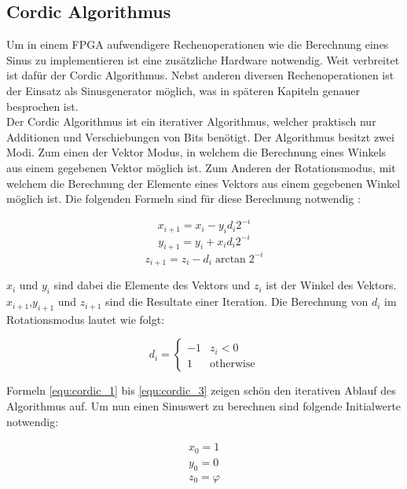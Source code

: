 \subsection{Cordic Algorithmus}\label{subsec:Cordic}

Um in einem FPGA aufwendigere Rechenoperationen wie die Berechnung eines Sinus zu implementieren ist eine zusätzliche Hardware notwendig. Weit verbreitet ist dafür der Cordic Algorithmus. Nebst anderen diversen Rechenoperationen ist der Einsatz als Sinusgenerator möglich, was in späteren Kapiteln genauer besprochen ist. \\
Der Cordic Algorithmus ist ein iterativer Algorithmus, welcher praktisch nur Additionen und Verschiebungen von Bits benötigt. 
Der Algorithmus besitzt zwei Modi. Zum einen der Vektor Modus, in welchem die Berechnung eines Winkels aus einem gegebenen Vektor möglich ist. Zum Anderen der Rotationsmodus, mit welchem die Berechnung der Elemente eines Vektors aus einem gegebenen Winkel möglich ist. Die folgenden Formeln sind für diese Berechnung notwendig \cite{Cordic}:

\begin{equation}
x_{i+1} = x_i - y_id_i2^{-i}
\label{equ:cordic_1}
\end{equation} 
\begin{equation}
y_{i+1} = y_i + x_id_i2^{-i}
\label{equ:cordic_2}
\end{equation} 
\begin{equation}
z_{i+1} = z_i - d_i\arctan{2^{-i}}
\label{equ:cordic_3}
\end{equation} 

\(x_i\) und \(y_i\) sind dabei die Elemente des Vektors und \(z_i\) ist der Winkel des Vektors. \(x_{i+1}\),\(y_{i+1}\) und \(z_{i+1}\) sind die Resultate einer Iteration.
Die Berechnung von \(d_i\) im Rotationsmodus lautet wie folgt: 

\begin{equation}
d_i=
\begin{cases}
-1 &z_i < 0 \\
1 &\text{otherwise}
\end{cases}
\label{equ:cordic_4}
\end{equation} 

Formeln \ref{equ:cordic_1} bis \ref{equ:cordic_3} zeigen schön den iterativen Ablauf des Algorithmus auf. Um nun einen Sinuswert zu berechnen sind folgende Initialwerte notwendig:

\begin{equation}
\begin{aligned}
x_0 = 1 \\
y_0 = 0 \\
z_0 = \varphi
\end{aligned}
\label{equ:cordic_5}
\end{equation} 

